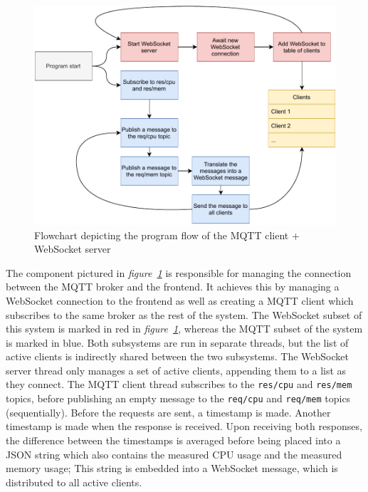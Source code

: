 \begin{figure}[H]
	\begin{center}
		\includegraphics[width=\textwidth]{./doc/mqtt_ws_flowchart.pdf}
		\caption{Flowchart depicting the program flow of the MQTT client + WebSocket server}
		\label{mqtt-ws}
	\end{center}
\end{figure}

The component pictured in \textit{figure~\ref{mqtt-ws}} is responsible for managing the connection between the MQTT broker and the frontend. It achieves this by managing a WebSocket connection to the frontend as well as creating a MQTT client which subscribes to the same broker as the rest of the system. The WebSocket subset of this system is marked in red in \textit{figure~\ref{mqtt-ws}}, whereas the MQTT subset of the system is marked in blue. Both subsystems are run in separate threads, but the list of active clients is indirectly shared between the two subsystems. The WebSocket server thread only manages a set of active clients, appending them to a list as they connect. The MQTT client thread subscribes to the \lstinline{res/cpu} and \lstinline{res/mem} topics, before publishing an empty message to the \lstinline{req/cpu} and \lstinline{req/mem} topics (sequentially). Before the requests are sent, a timestamp is made. Another timestamp is made when the response is received. Upon receiving both responses, the difference between the timestamps is averaged before being placed into a JSON string which also contains the measured CPU usage and the measured memory usage; This string is embedded into a WebSocket message, which is distributed to all active clients. 

